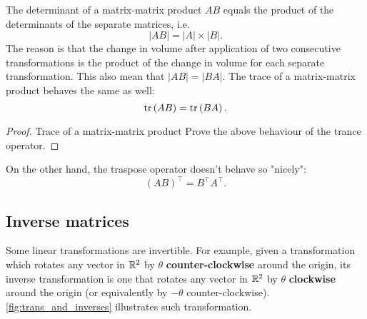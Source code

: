 The determinant of a matrix-matrix product $AB$ equals the product of the determinants of the separate matrices, i.e.
\begin{equation}
	|AB| = |A|\times|B|.
	\label{eq:determinant_AB}
\end{equation}
The reason is that the change in volume after application of two consecutive transformations is the product of the change in volume for each separate transformation. This also mean that $|AB|=|BA|$. The trace of a matrix-matrix product behaves the same as well:
\begin{equation}
	\tr\left(AB\right) = \tr\left(BA\right).
	\label{eq:}
\end{equation}

\begin{proof}{Trace of a matrix-matrix product}{}
	Prove the above behaviour of the trance operator.
\end{proof}

On the other hand, the traspose operator doesn't behave so "nicely":
\begin{equation}
	\left(AB\right)^{\top} = B^{\top}A^{\top}.
	\label{eq:}
\end{equation}

\subsection{Inverse matrices}
Some linear transformations are invertible. For example, given a transformation which rotates any vector in $\Rs[2]$ by $\theta$ \textbf{counter-clockwise} around the origin, its inverse transformation is one that rotates any vector in $\Rs[2]$ by $\theta$ \textbf{clockwise} around the origin (or equivalently by $-\theta$ counter-clockwise). \autoref{fig:trans_and_inverses} illustrates such transformation.

